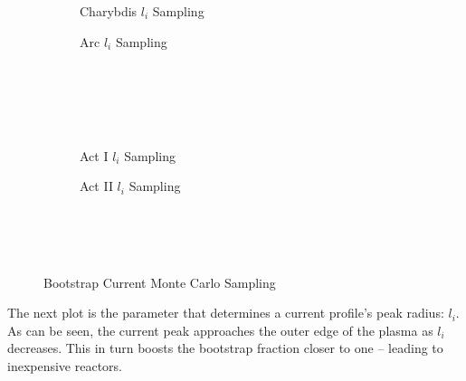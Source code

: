 \begin{figure*}
    \centering
    \hfill 
    \begin{subfigure}[t]{0.45\textwidth}
        \centering
		\begin{adjustbox}{width=\textwidth}
			\Large
			
		\end{adjustbox}
        \caption{Charybdis $l_i$ Sampling}
    \end{subfigure}
    \hfill
    \begin{subfigure}[t]{0.45\textwidth}
        \centering
		\begin{adjustbox}{width=\textwidth}
			\Large
			
		\end{adjustbox}
        \caption{Arc $l_i$ Sampling}
    \end{subfigure}
    \hfill \hfill ~\\ ~\\ ~\\ ~\\
    \hfill 
    \begin{subfigure}[t]{0.45\textwidth}
        \centering
		\begin{adjustbox}{width=\textwidth}
			\Large
			
		\end{adjustbox}
        \caption{Act I $l_i$ Sampling}
    \end{subfigure}
    \hfill
    \begin{subfigure}[t]{0.45\textwidth}
        \centering
		\begin{adjustbox}{width=\textwidth}
			\Large
			
		\end{adjustbox}
        \caption{Act II $l_i$ Sampling}
    \end{subfigure}	
    \hfill \hfill ~\\ ~\\ ~\\
    \caption{Bootstrap Current Monte Carlo Sampling}
    \label{fig:bootstrap_samplings}
\end{figure*}

The next plot is the parameter that determines a current profile's peak radius: $l_i$. As can be seen, the current peak approaches the outer edge of the plasma as $l_i$ decreases. This in turn boosts the bootstrap fraction closer to one -- leading to inexpensive reactors.

